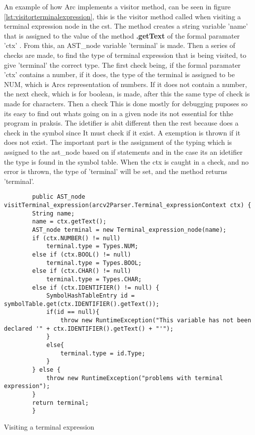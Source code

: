 An example of how Arc implements a visitor method, can be seen in figure \ref{lst:visitorterminalexpression}, this is the visitor method called when visiting a terminal expression node in the \gls{cst}. The method creates a string variable 'name' that is assigned to the value of the method \textbf{.getText} of the formal paramater 'ctx' . From this, an AST\_node variable 'terminal' is made. Then a series of checks are made, to find the type of terminal expression that is being visited, to give 'terminal' the correct type. The first check being, if the formal paramater 'ctx' contains a number, if it does, the type of the terminal is assigned to be NUM, which is Arcs representation of numbers. If it does not contain a number, the next check, which is for boolean, is made, after this the same type of check is made for characters. Then a check This is done mostly for debugging puposes so its easy to find out whats going on in a given node its not essential for thhe program in praksis. The idetifier is abit different then the rest because does a check in the symbol since It must check if it exist. A exemption is thrown if it does not exist. The important part is the assignment of the typing which is assigned to the ast\_node based on if statements and in the case its an idetifier the type is found in the symbol table. When the ctx is caught in a check, and no error is thrown, the type of 'terminal' will be set, and the method returns 'terminal'.


\begin{listing}[htb!]
    \begin{verbatim}
        public AST_node visitTerminal_expression(arcv2Parser.Terminal_expressionContext ctx) {
        String name;
        name = ctx.getText();
        AST_node terminal = new Terminal_expression_node(name);
        if (ctx.NUMBER() != null)
            terminal.type = Types.NUM;
        else if (ctx.BOOL() != null)
            terminal.type = Types.BOOL;
        else if (ctx.CHAR() != null)
            terminal.type = Types.CHAR;
        else if (ctx.IDENTIFIER() != null) {
            SymbolHashTableEntry id = symbolTable.get(ctx.IDENTIFIER().getText());
            if(id == null){
                throw new RuntimeException("This variable has not been declared '" + ctx.IDENTIFIER().getText() + "'");
            }
            else{
                terminal.type = id.Type;
            }
        } else {
            throw new RuntimeException("problems with terminal expression");
        }
        return terminal;
        }
    \end{verbatim}
    \caption{Visiting a terminal expression}
    \label{lst:visitorterminalexpression}
\end{listing}


